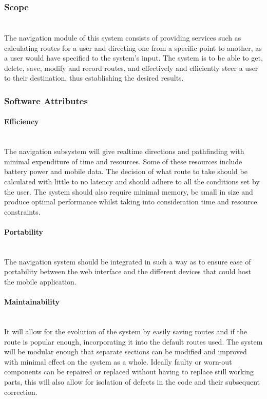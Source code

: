 \subsubsection{Scope}
\paragraph{}
\mbox{}\\
The navigation module of this system consists of providing services such as 
calculating routes for a user and directing one from a specific point to another, 
as a user would have specified to the system’s input. The system is to be able 
to get, delete, save, modify and record routes, and effectively and efficiently steer 
a user to their destination, thus establishing the desired results.


\subsubsection{Software Attributes}

	\paragraph{Efficiency}
	\mbox{}\\
	The navigation subsystem will give realtime directions and pathfinding with minimal 
	expenditure of time and resources. Some of these resources include battery power and mobile 
	data. The decision of what route to take should be calculated with little to no latency and 
	should adhere to all the conditions set by the user. The system should also require minimal 
	memory, be small in size and produce optimal performance whilst taking into consideration 
	time and resource constraints.

	\paragraph{Portability}
	\mbox{}\\
	The navigation system should be integrated in such a way as to ensure ease of portability
	 between the web interface and the different devices that could host the mobile application. 

	\paragraph{Maintainability}
	\mbox{}\\
	It will allow for the evolution of the system by easily saving routes and if the route is 
	popular enough, incorporating it into the default routes used. The system will be modular
	 enough that separate sections can be modified and improved with minimal effect on the 
	 system as a whole. Ideally faulty or worn-out components can be repaired or replaced
	  without having to replace still working parts, this will also allow for isolation of
	  defects in the code and their subsequent correction.
	
